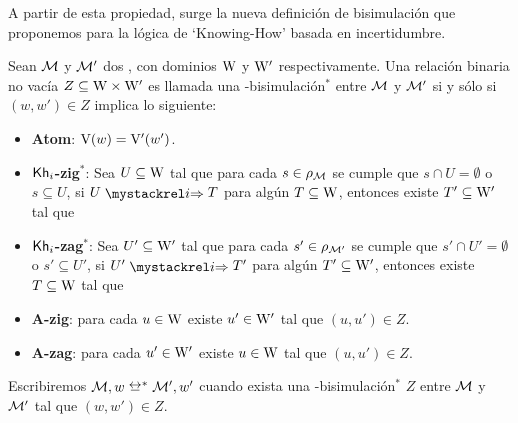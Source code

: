 A partir de esta propiedad, surge la nueva definición de bisimulación que proponemos para la lógica de `Knowing-How' basada en 
incertidumbre.

\begin{definicion}\label{def:bisim_redefinition}
    Sean $\mathcal{M}$ y $\mathcal{M}'$ dos \ultss, con dominios $\mathrm{W}$ y $\mathrm{W}'$ respectivamente.
    Una relación binaria no vacía $Z \subseteq \mathrm{W} \times \mathrm{W}'$ es llamada una \KHilogic-bisimulación$^*$ entre $\mathcal{M}$ y 
    $\mathcal{M}'$ si y sólo si $(w,w') \in Z$ implica lo siguiente:
    \begin{itemize}
        \item \textbf{Atom}: $\mathrm{V}(w)=\mathrm{V}'(w')$.

        \item \textbf{$\mathsf{Kh}_i$-zig$^*$}: Sea $U \subseteq \mathrm{W}$ tal que para cada $s \in \rho_{\mathcal{M}}$ se cumple que $s \cap U = \emptyset$ o $s \subseteq U$, si $U \ultsExecAgi T$ para algún $T \subseteq \mathrm{W}$, entonces existe $T' \subseteq \mathrm{W}'$ tal que
        \begin{multicols}{2}
        \end{multicols}
        
        \item \textbf{$\mathsf{Kh}_i$-zag$^*$}: Sea $U' \subseteq \mathrm{W}'$ tal que para cada $s' \in \rho_{\mathcal{M}'}$ se cumple que $s' \cap U' = \emptyset$ o $s' \subseteq U'$, si $U' \ultsExecAgi T'$ para algún $T' \subseteq \mathrm{W}'$, entonces existe $T \subseteq \mathrm{W}$ tal que
        \begin{multicols}{2}
        \end{multicols}

        \item \textbf{A-zig}: para cada $u \in \mathrm{W}$ existe $u' \in \mathrm{W}'$ tal que $(u,u') \in Z$.

        \item \textbf{A-zag}: para cada $u' \in \mathrm{W}'$ existe $u \in \mathrm{W}$ tal que $(u,u') \in Z$.
    \end{itemize} 

    Escribiremos $\modults,w \bisim^* \modults',w'$ cuando exista una \KHilogic-bisimulación$^*$ $Z$ entre
    $\mathcal{M}$ y $\mathcal{M}'$ tal que $(w,w') \in Z$.
\end{definicion}


